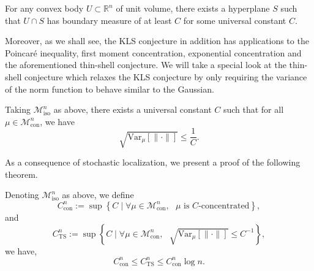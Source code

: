 \begin{conjecture}
  For any convex body \(U \subset \mathbb{R}^n\) of unit volume, there exists a hyperplane \(S\) such 
  that \(U \cap S\) has boundary measure of at least \(C\) for some universal constant \(C\). 
\end{conjecture}

Moreover, as we shall see, the KLS conjecture in addition has applications to the Poincaré inequality, 
first moment concentration, exponential concentration and the aforementioned thin-shell conjecture. 
We will take a special look at the thin-shell conjecture which relaxes the KLS conjecture by 
only requiring the variance of the norm function to behave similar to the Gaussian.

\begin{conjecture}
  Taking \(\mathscr{M}^n_{\text{iso}}\) as above, there exists a universal constant \(C\) such that 
  for all \(\mu \in \mathscr{M}^n_{\text{con}}\), we have
  \[\sqrt{\text{Var}_\mu[\|\cdot\|]} \le \frac{1}{C}.\]
\end{conjecture}


As a consequence of stochastic localization, we present a proof of the following theorem.

\begin{theorem}\label{thm:KLS_to_TS}
  Denoting \(\mathscr{M}^n_{\text{iso}}\) as above, we define 
  \[C^n_{\text{con}} := \sup \left\{C \mid \text{\(\forall \mu \in \mathscr{M}^n_{\text{con}},\) 
    \(\mu\) is \(C\)-concentrated}\right\},\]
  and 
  \[C^n_{\text{TS}} := \sup \left\{C \mid \text{\(\forall \mu \in \mathscr{M}^n_{\text{con}},\) 
      \(\sqrt{\text{Var}_\mu[\|\cdot\|]} \le C^{-1}\)}\right\},\]
  we have,
  \[C^n_{\text{con}} \le C^n_{\text{TS}} \le C^n_{\text{con}}\log n.\]
\end{theorem}


